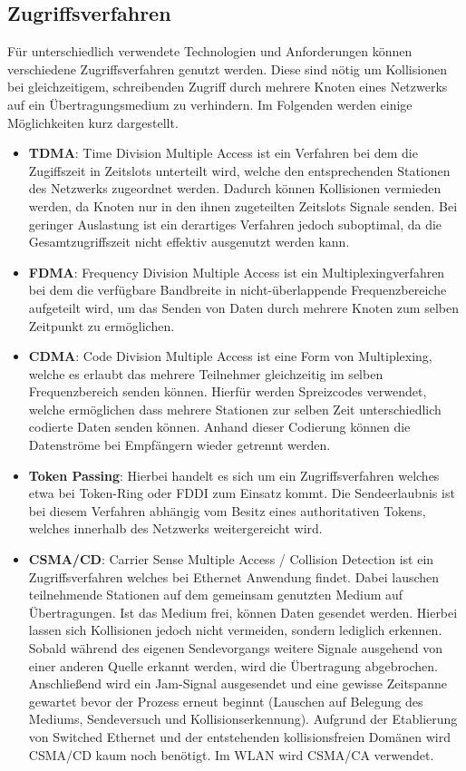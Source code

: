     \subsection{Zugriffsverfahren}
    Für unterschiedlich verwendete Technologien und Anforderungen können verschiedene Zugriffsverfahren genutzt werden. Diese sind nötig um Kollisionen bei gleichzeitigem,
    schreibenden Zugriff durch mehrere Knoten eines Netzwerks auf ein Übertragungsmedium zu verhindern. Im Folgenden werden einige Möglichkeiten kurz dargestellt.
        \begin{itemize}
            \item \textbf{TDMA}: Time Division Multiple Access ist ein Verfahren bei dem die Zugiffszeit in Zeitslots unterteilt wird, welche den entsprechenden
            Stationen des Netzwerks zugeordnet werden. Dadurch können Kollisionen vermieden werden, da Knoten nur in den ihnen zugeteilten Zeitslots Signale 
            senden. Bei geringer Auslastung ist ein derartiges Verfahren jedoch suboptimal, da die Gesamtzugriffszeit nicht effektiv ausgenutzt werden kann.
            \item \textbf{FDMA}: Frequency Division Multiple Access ist ein Multiplexingverfahren bei dem die verfügbare Bandbreite in nicht-überlappende Frequenzbereiche aufgeteilt wird,
            um das Senden von Daten durch mehrere Knoten zum selben Zeitpunkt zu ermöglichen.
            \item \textbf{CDMA}: Code Division Multiple Access ist eine Form von Multiplexing, welche es erlaubt das mehrere Teilnehmer gleichzeitig im selben Frequenzbereich
            senden können. Hierfür werden Spreizcodes verwendet, welche ermöglichen dass mehrere Stationen zur selben Zeit unterschiedlich codierte Daten senden können.
            Anhand dieser Codierung können die Datenströme bei Empfängern wieder getrennt werden.
            \item \textbf{Token Passing}: Hierbei handelt es sich um ein Zugriffsverfahren welches etwa bei Token-Ring oder FDDI zum Einsatz kommt. Die Sendeerlaubnis ist bei diesem
            Verfahren abhängig vom Besitz eines authoritativen Tokens, welches innerhalb des Netzwerks weitergereicht wird.
            \item \textbf{CSMA/CD}: Carrier Sense Multiple Access / Collision Detection ist ein Zugriffsverfahren welches bei Ethernet Anwendung findet. Dabei lauschen teilnehmende Stationen
            auf dem gemeinsam genutzten Medium auf Übertragungen. Ist das Medium frei, können Daten gesendet werden. Hierbei lassen sich Kollisionen jedoch nicht vermeiden, sondern lediglich 
            erkennen. Sobald während des eigenen Sendevorgangs weitere Signale ausgehend von einer anderen Quelle erkannt werden, wird die Übertragung abgebrochen. Anschließend wird ein
            Jam-Signal ausgesendet und eine gewisse Zeitspanne gewartet bevor der Prozess erneut beginnt (Lauschen auf Belegung des Mediums, Sendeversuch und Kollisionserkennung).
            Aufgrund der Etablierung von Switched Ethernet und der entstehenden kollisionsfreien Domänen wird CSMA/CD kaum noch benötigt. Im WLAN wird CSMA/CA verwendet.
        \end{itemize}

